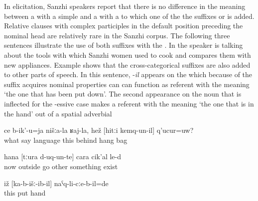 In elicitation, Sanzhi speakers report that there is no difference in the meaning between a  with a simple  and a  with a  to which one of the the suffixes  or  is added. Relative clauses with complex participles in the default position preceding the nominal head are relatively rare in the Sanzhi corpus. The following three sentences  illustrate the use of both suffixes with the . In  the speaker is talking about the tools with which Sanzhi women used to cook and compares them with new appliances. Example  shows that the cross-categorical suffixes are also added to other parts of speech. In this sentence, -\textit{il} appears on the  which because of the suffix acquires nominal properties can can function as referent with the meaning `the one that has been put down'. The second appearance on the noun that is inflected for the -essive case makes a referent with the meaning `the one that is in the hand' out of a spatial adverbial

\begin{exe}
	\ex	\label{ex:‎How do we call in our language the back that hangs behind his back?}
	\gll	ce	b-ik'-u=ja	nišːa-la	ʁaj-la,	hež	[hitːi	kemq-un-il]	q'ucur=uw?\\
		what	say		language	this	behind	hang		bag\\
	\glt	{}

	\ex	\label{ex:‎‎‎Now there are other things that appeared (lit. went out)}
	\gll	hana	[tːura	d-uq-un-te]	cara	cik'al	le-d\\
		now	outside	go 	other	something	exist\\
	\glt	{}
	
	\ex	\label{ex:The one that was in the hand had been put down}
\gll	iž	[ka-b-išː-ib-il]	naˁq-li-cːe-b-il=de\\
	this	put	hand\\
	\glt	{}
\end{exe}


